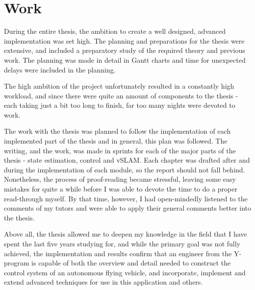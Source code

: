 \section{Work}
\label{sec:work}
	During the entire thesis, the ambition to create a well designed, advanced 
	implementation was set high. 
	The planning and preparations for the thesis were extensive, and included
	a preparatory study of the required theory and previous work. 
	The planning was made in detail in Gantt charts and time for unexpected 
	delays were included in the planning.
	
	The high ambition of the project unfortunately resulted in a constantly high
	workload, and since there were quite an amount of components to the thesis - 
	each taking just a bit too long to finish, far too many nights were devoted to work.
	
	The work with the thesis was planned to follow the implementation of each
	implemented part of the thesis and in general, this plan was followed. 
	The writing, and the work, was made in sprints for each of the major parts
	of the thesis - state estimation, control and vSLAM. Each chapter
	was drafted after and during the implementation of each module, so
	the report should not fall behind.
	Nonetheless, the process of proof-reading became stressful, leaving
	some easy mistakes for quite a while before I was able to devote the time
	to do a proper read-through myself. By that time, however, I had open-mindedly
	listened to the comments of my tutors and were able to apply their general 
	comments better into the thesis.
	
	Above all, the thesis allowed me to deepen my knowledge in the field
	that I have spent the last five years studying for, and while the primary
	goal was not fully achieved, the implementation and results confirm that
	an engineer from the Y-program is capable of both the overview and detail
	needed to construct the control system of an autonomous flying vehicle, 
	and incorporate, implement and extend advanced techniques for use in 
	this application and others.
